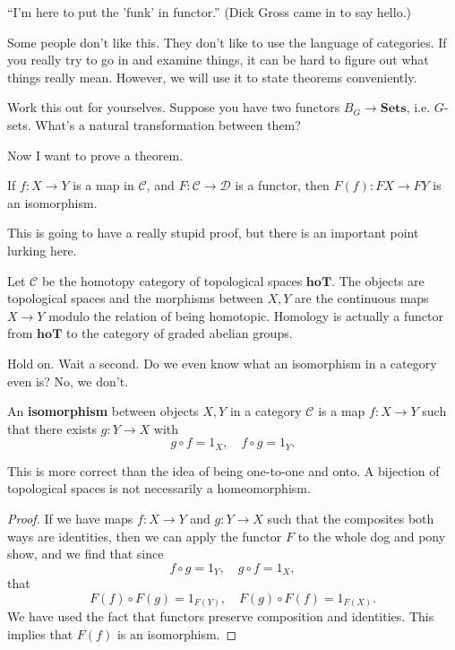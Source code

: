\begin{remark} 
``I'm here to put the 'funk' in functor.'' (Dick Gross came in to say hello.)
\end{remark} 

Some people don't like this. They don't like to use the language of categories.
If you really try to go in and examine things, it can be hard to figure out
what things really mean.
However, we will use it to state theorems conveniently. 


\begin{exercise} 
Work this out for yourselves. Suppose you have two functors $B_G \to
\mathbf{Sets}$, i.e. $G$-sets. What's a natural transformation between them?
\end{exercise} 

Now I want to prove a theorem.
\begin{theorem} 
If $f: X \to Y$ is a map in $\mathcal{C}$, and $F: \mathcal{C} \to \mathcal{D}$
is a functor, then $F(f): FX \to FY$ is an isomorphism. 
\end{theorem} 
This is going to have a really stupid proof, but there is an important point
lurking here.
\begin{example} 
Let $\mathcal{C}$ be the homotopy category of topological spaces
$\mathbf{hoT}$. The objects are topological spaces and the morphisms between
$X, Y$ are the continuous maps $X \to Y$ modulo the relation of being
homotopic. Homology is actually a functor from $\mathbf{hoT}$ to the category
of graded abelian groups.
\end{example} 


Hold on. Wait a second. Do we even know what an isomorphism in a category even
is? No, we don't.

\begin{definition} 
An \textbf{isomorphism} between objects $X, Y$ in a category $\mathcal{C}$ is a
map $f: X \to Y$ such that there exists $g: Y \to X$ with 
\[ g \circ f = 1_X, \quad f \circ g = 1_Y.  \]
\end{definition} 

This is more correct than the idea of being one-to-one and onto. A bijection of
topological spaces is not necessarily a homeomorphism.


\begin{proof} 
If we have maps $f: X \to Y$ and $g : Y \to X$ such that the composites both
ways are identities, then we can apply the functor $F$ to the whole dog and
pony show, and we find that since
\[ f \circ g = 1_Y, \quad g \circ f = 1_X,   \]
that
\[ F(f) \circ F(g) = 1_{F(Y)}, \quad F(g) \circ F(f) = 1_{F(X)}.  \]
We have used the fact that functors preserve composition and identities. This
implies that $F(f)$ is an isomorphism. 
\end{proof} 

